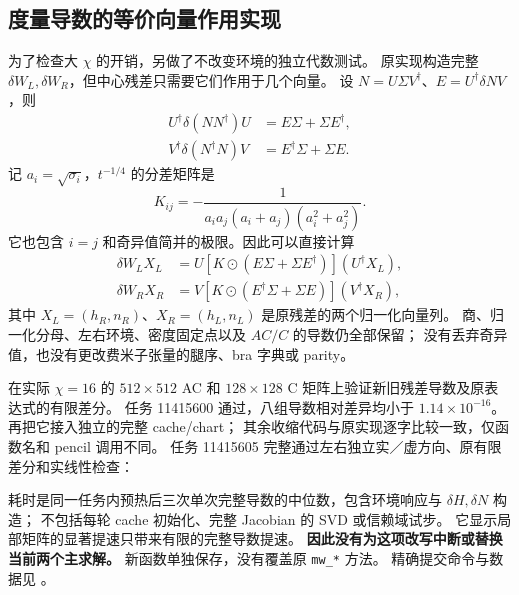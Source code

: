 \documentclass[11pt]{article}
\newcommand{\code}[1]{{\small\texttt{#1}}}
\begin{document}
\subsection{度量导数的等价向量作用实现}
为了检查大 $\chi$ 的开销，另做了不改变环境的独立代数测试。
原实现构造完整 $\delta W_L,\delta W_R$，但中心残差只需要它们作用于几个向量。
设 $N=U\Sigma V^\dagger$、$E=U^\dagger\delta N V$，则
\begin{align}
 U^\dagger\delta(NN^\dagger)U&=E\Sigma+\Sigma E^\dagger,\\
 V^\dagger\delta(N^\dagger N)V&=E^\dagger\Sigma+\Sigma E.
\end{align}
记 $a_i=\sqrt{\sigma_i}$，$t^{-1/4}$ 的分差矩阵是
\begin{equation}
 K_{ij}=-\frac{1}{a_i a_j(a_i+a_j)(a_i^2+a_j^2)}.
\end{equation}
它也包含 $i=j$ 和奇异值简并的极限。因此可以直接计算
\begin{align}
 \delta W_L X_L&=U\left[K\odot(E\Sigma+\Sigma E^\dagger)\right](U^\dagger X_L),\\
 \delta W_R X_R&=V\left[K\odot(E^\dagger\Sigma+\Sigma E)\right](V^\dagger X_R),
\end{align}
其中 $X_L=(h_R,n_R)$、$X_R=(h_L,n_L)$ 是原残差的两个归一化向量列。
商、归一化分母、左右环境、密度固定点以及 $AC/C$ 的导数仍全部保留；
没有丢弃奇异值，也没有更改费米子张量的腿序、bra 字典或 parity。

 在实际 $\chi=16$ 的 $512\times512$ AC
和 $128\times128$ C 矩阵上验证新旧残差导数及原表达式的有限差分。
任务 11415600 通过，八组导数相对差异均小于 $1.14\times10^{-16}$。
 再把它接入独立的完整 cache/chart；
其余收缩代码与原实现逐字比较一致，仅函数名和 pencil 调用不同。
任务 11415605 完整通过左右独立实／虚方向、原有限差分和实线性检查：
\begin{center}\small

\end{center}
耗时是同一任务内预热后三次单次完整导数的中位数，包含环境响应与 $\delta H,\delta N$ 构造；
不包括每轮 cache 初始化、完整 Jacobian 的 SVD 或信赖域试步。
它显示局部矩阵的显著提速只带来有限的完整导数提速。
\textbf{因此没有为这项改写中断或替换当前两个主求解。}
新函数单独保存，没有覆盖原 \code{mw\_*} 方法。
精确提交命令与数据见
。
\end{document}
